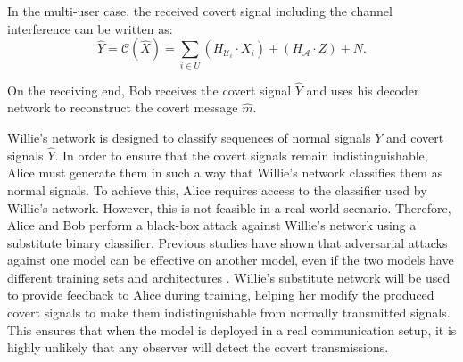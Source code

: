 In the multi-user case, the received covert signal including the channel interference can be written as:
\begin{equation}
	\hat{Y} = \mathcal{C}(\hat{X}) = \sum_{i \in U}(H_{\mathcal{U}_i} \cdot X_i) + (H_{\mathcal{A}} \cdot Z) + N.
\end{equation}

On the receiving end, Bob receives the covert signal \(\hat{Y}\) and uses his decoder network to reconstruct the covert message \(\hat{m}\).

Willie's network is designed to classify sequences of normal signals \(Y\) and covert signals \(\hat{Y}\). In order to ensure that the covert signals remain indistinguishable, Alice must generate them in such a way that Willie's network classifies them as normal signals. To achieve this, Alice requires access to the classifier used by Willie's network. However, this is not feasible in a real-world scenario. Therefore, Alice and Bob perform a black-box attack against Willie's network using a substitute binary classifier. Previous studies have shown that adversarial attacks against one model can be effective on another model, even if the two models have different training sets and architectures \cite{papernot2016transferability}. Willie's substitute network will be used to provide feedback to Alice during training, helping her modify the produced covert signals to make them indistinguishable from normally transmitted signals. This ensures that when the model is deployed in a real communication setup, it is highly unlikely that any observer will detect the covert transmissions.


